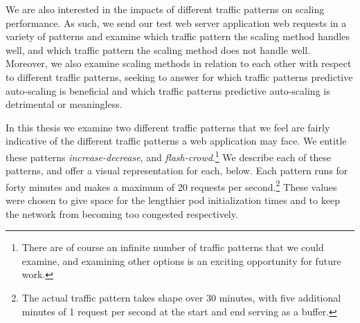 We are also interested in the impacts of different traffic patterns on scaling
performance. As such, we send our test web server application web requests in a
variety of patterns and examine which traffic pattern the scaling method handles
well, and which traffic pattern the scaling method does not handle well.
Moreover, we also examine scaling methods in relation to each other with respect
to different traffic patterns, seeking to answer for which traffic patterns
predictive auto-scaling is beneficial and which traffic patterns predictive
auto-scaling is detrimental or meaningless.

In this thesis we examine two different traffic patterns that we feel are
fairly indicative of the different traffic patterns a web application may face.
We entitle these patterns \textit{increase-decrease}, and
\textit{flash-crowd}.\footnote{There are of course an infinite number of traffic
patterns that we could examine, and examining other options is an exciting
opportunity for future work.} We describe each of these patterns, and offer a
visual representation for each, below. Each pattern runs for forty minutes and makes
a maximum of 20 requests per second.\footnote{The actual traffic pattern takes
shape over 30 minutes, with five additional minutes of 1 request per second at
the start and end serving as a buffer.} These values were chosen to give
space for the lengthier pod initialization times and to keep the network from
becoming too congested respectively.

